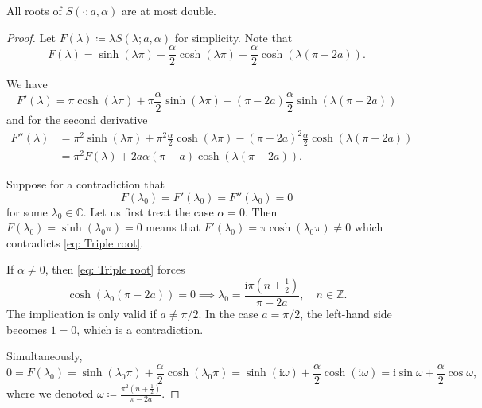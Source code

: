\documentclass[10pt,a4paper]{amsart}
\begin{document}
\begin{proposition}\label{P: Roots at most double}
    All roots of $S(\cdot; a, \alpha)$ are at most double.
\end{proposition}

\begin{proof}
    Let $F(\lambda) \coloneqq \lambda S(\lambda; a, \alpha)$ for simplicity. Note that
    \[
    F(\lambda) = \sinh(\lambda\pi) + \frac{\alpha}{2}\cosh(\lambda\pi)-\frac{\alpha}{2}\cosh(\lambda(\pi-2a)).
    \]

    We have
    \begin{equation}
    F'(\lambda) = \pi\cosh(\lambda\pi) + \pi\frac{\alpha}{2}\sinh(\lambda\pi) - (\pi-2a)\frac{\alpha}{2}\sinh(\lambda(\pi-2a))
    \label{FDerivative}
    \end{equation}
    and for the second derivative
    \begin{align*}
    F''(\lambda) &= \pi^2\sinh(\lambda\pi) + \pi^2 \frac{\alpha}{2}\cosh(\lambda\pi) -(\pi-2a)^2\frac{\alpha}{2}\cosh(\lambda(\pi-2a)) \\
    &= \pi^2F(\lambda) + 2a\alpha(\pi-a)\cosh(\lambda(\pi-2a)).
    \end{align*}

    Suppose for a contradiction that 
    \begin{equation}
    F(\lambda_0) = F'(\lambda_0) = F''(\lambda_0) = 0
    \label{eq: Triple root}
    \end{equation}
    for some $\lambda_0 \in \mathbb C$. Let us first treat the case $\alpha = 0$. Then $F(\lambda_0) = \sinh(\lambda_0\pi) = 0$ means that $F'(\lambda_0) = \pi\cosh(\lambda_0\pi) \neq 0$ which contradicts \eqref{eq: Triple root}.
    
    
    If $\alpha \neq 0$, then \eqref{eq: Triple root} forces 
    \[
    \cosh(\lambda_0(\pi-2a)) = 0 \implies \lambda_0 = \frac{\mathrm{i}\pi\left(n + \frac{1}{2}\right)}{\pi - 2a}, \quad n \in \mathbb Z.
    \]
    The implication is only valid if $a \neq \pi/2$. In the case $a=\pi/2$, the left-hand side becomes $1=0$, which is a contradiction.


    Simultaneously,
    \begin{equation}
    0 = F(\lambda_0) = \sinh(\lambda_0\pi) + \frac{\alpha}{2}\cosh(\lambda_0\pi) = \sinh(\mathrm{i}\omega) + \frac{\alpha}{2}\cosh(\mathrm{i}\omega) = \mathrm{i}\sin\omega + \frac{\alpha}{2}\cos\omega,
    \label{DoubleEigenvaluesProof}
    \end{equation}
    where we denoted $\omega \coloneqq \frac{\pi^2\left(n + \frac{1}{2}\right)}{\pi-2a}$.


\end{proof}
\end{document}
